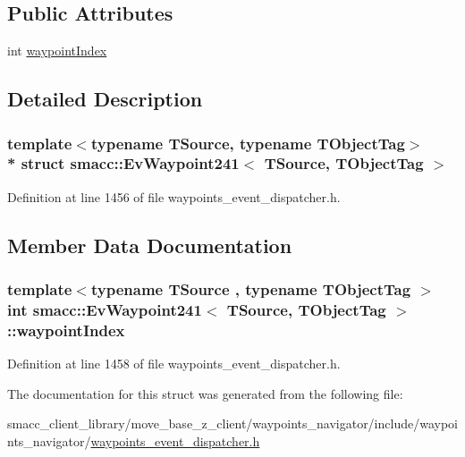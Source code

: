 \subsection*{Public Attributes}
\begin{DoxyCompactItemize}
\item 
int \hyperlink{structsmacc_1_1EvWaypoint241_ad1d8132a3786d4b9a68d68ba034e06fa}{waypoint\+Index}
\end{DoxyCompactItemize}


\subsection{Detailed Description}
\subsubsection*{template$<$typename T\+Source, typename T\+Object\+Tag$>$\\*
struct smacc\+::\+Ev\+Waypoint241$<$ T\+Source, T\+Object\+Tag $>$}



Definition at line 1456 of file waypoints\+\_\+event\+\_\+dispatcher.\+h.



\subsection{Member Data Documentation}
\subsubsection[{\texorpdfstring{waypoint\+Index}{waypointIndex}}]{\setlength{\rightskip}{0pt plus 5cm}template$<$typename T\+Source , typename T\+Object\+Tag $>$ int {\bf smacc\+::\+Ev\+Waypoint241}$<$ T\+Source, T\+Object\+Tag $>$\+::waypoint\+Index}\hypertarget{structsmacc_1_1EvWaypoint241_ad1d8132a3786d4b9a68d68ba034e06fa}{}\label{structsmacc_1_1EvWaypoint241_ad1d8132a3786d4b9a68d68ba034e06fa}


Definition at line 1458 of file waypoints\+\_\+event\+\_\+dispatcher.\+h.



The documentation for this struct was generated from the following file\+:\begin{DoxyCompactItemize}
\item 
smacc\+\_\+client\+\_\+library/move\+\_\+base\+\_\+z\+\_\+client/waypoints\+\_\+navigator/include/waypoints\+\_\+navigator/\hyperlink{waypoints__event__dispatcher_8h}{waypoints\+\_\+event\+\_\+dispatcher.\+h}\end{DoxyCompactItemize}
